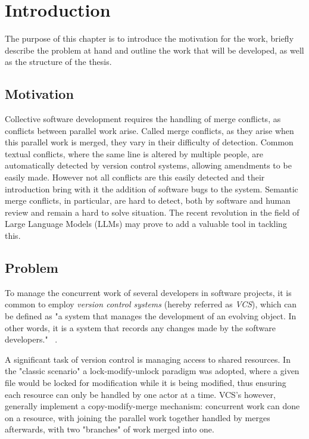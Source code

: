 \chapter{Introduction} \label{chap:intro}

The purpose of this chapter is to introduce the motivation for the work, briefly describe the problem at hand and outline the work that will be developed, as well as the structure of the thesis.

\section{Motivation} \label{sec:motivation}

Collective software development requires the handling of merge conflicts, as conflicts between parallel work arise. Called merge conflicts, as they arise when this parallel work is merged, they vary in their difficulty of detection.
Common textual conflicts, where the same line is altered by multiple people, are automatically detected by version control systems, allowing amendments to be easily made. However not all conflicts are this easily detected and their introduction bring with it the addition of software bugs to the system. Semantic merge conflicts, in particular, are hard to detect, both by software and human review and remain a hard to solve situation.
The recent revolution in the field of Large Language Models (LLMs) may prove to add a valuable tool in tackling this.


\section{Problem} \label{sec:problem}

To manage the concurrent work of several developers in software projects, it is common to employ \emph{version control systems} (hereby referred as \emph{VCS}), which can be defined as "a system that manages the development of an evolving object. In other words, it is a system that records any changes made by the software developers." ~\citep{kn:vers_review}.

A significant task of version control is managing access to shared resources.
In the "classic scenario" a lock-modify-unlock paradigm was adopted, where a given file would be locked for modification while it is being modified, thus ensuring each resource can only be handled by one actor at a time. VCS's however, generally implement a copy-modify-merge mechanism: concurrent work can done on a resource, with joining the parallel work together handled by merges afterwards, with two "branches" of work merged into one. ~\citep{kn:vers_ott}


